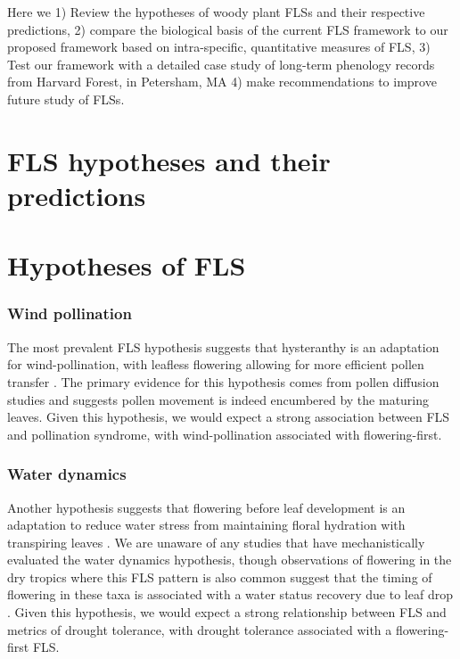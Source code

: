 \documentclass{article}
\begin{document}
\noindent Here we 1) Review the hypotheses of woody plant FLSs and their respective predictions, 2) compare the biological basis of the current FLS framework to our proposed framework based on intra-specific, quantitative measures of FLS, 3) Test our framework with a detailed case study of long-term phenology records from Harvard Forest, in Petersham, MA 4) make recommendations to improve future study of FLSs.
\section*{FLS hypotheses and their predictions}
\section*{Hypotheses of FLS}
\subsubsection*{ Wind pollination}
\noindent The most prevalent FLS hypothesis suggests that hysteranthy is an adaptation for wind-pollination, with leafless flowering allowing for more efficient pollen transfer \citep{Whitehead1969, Spurr1980,Friedman2009}. The primary evidence for this hypothesis comes from pollen diffusion studies \citep[e.g., particle movement through closed and open canopies][]{Niklas1985,Nathan2005, Milleron2012} and suggests pollen movement is indeed encumbered by the maturing leaves. Given this hypothesis, we would expect a strong association between FLS and pollination syndrome, with wind-pollination associated with flowering-first.

\subsubsection*{Water dynamics}
\noindent Another hypothesis suggests that flowering before leaf development is an adaptation to reduce water stress from maintaining floral hydration with transpiring leaves \citep{Franklin2016}. We are unaware of any studies that have mechanistically evaluated the water dynamics hypothesis, though observations of flowering in the dry tropics where this FLS pattern is also common suggest that the timing of flowering in these taxa is associated with a water status recovery due to leaf drop \citep{Borchert1983,Reich1984}. Given this hypothesis, we would expect a strong relationship between FLS and metrics of drought tolerance, with drought tolerance associated with a flowering-first FLS.  
\end{document}
